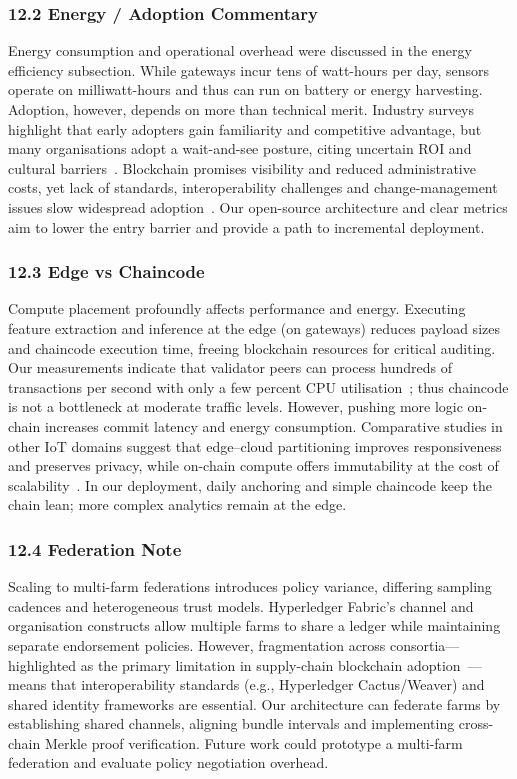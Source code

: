 \documentclass[12pt,onecolumn]{IEEEtran} %
\begin{document}
\subsubsection*{12.2 Energy / Adoption Commentary}
Energy consumption and operational overhead were discussed in the energy efficiency subsection. While gateways incur tens of watt-hours per day, sensors operate on milliwatt-hours and thus can run on battery or energy harvesting. Adoption, however, depends on more than technical merit. Industry surveys highlight that early adopters gain familiarity and competitive advantage, but many organisations adopt a wait-and-see posture, citing uncertain ROI and cultural barriers~\cite{ref167328542643761}. Blockchain promises visibility and reduced administrative costs, yet lack of standards, interoperability challenges and change-management issues slow widespread adoption~\cite{ref167328542643761}. Our open-source architecture and clear metrics aim to lower the entry barrier and provide a path to incremental deployment.

\subsubsection*{12.3 Edge vs Chaincode}
Compute placement profoundly affects performance and energy. Executing feature extraction and inference at the edge (on gateways) reduces payload sizes and chaincode execution time, freeing blockchain resources for critical auditing. Our measurements indicate that validator peers can process hundreds of transactions per second with only a few percent CPU utilisation~\cite{ref76853680998234}; thus chaincode is not a bottleneck at moderate traffic levels. However, pushing more logic on-chain increases commit latency and energy consumption. Comparative studies in other IoT domains suggest that edge–cloud partitioning improves responsiveness and preserves privacy, while on-chain compute offers immutability at the cost of scalability~\cite{ref167328542643761}. In our deployment, daily anchoring and simple chaincode keep the chain lean; more complex analytics remain at the edge.

\subsubsection*{12.4 Federation Note}
Scaling to multi-farm federations introduces policy variance, differing sampling cadences and heterogeneous trust models. Hyperledger Fabric’s channel and organisation constructs allow multiple farms to share a ledger while maintaining separate endorsement policies. However, fragmentation across consortia—highlighted as the primary limitation in supply-chain blockchain adoption~\cite{ref167328542643761}—means that interoperability standards (e.g., Hyperledger Cactus/Weaver) and shared identity frameworks are essential. Our architecture can federate farms by establishing shared channels, aligning bundle intervals and implementing cross-chain Merkle proof verification. Future work could prototype a multi-farm federation and evaluate policy negotiation overhead.
\end{document}
